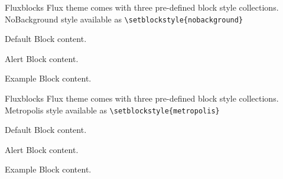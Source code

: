 \documentclass[9pt]{beamer}
\begin{document}
\begin{frame}[fragile]{Flux}{blocks}
  		Flux theme comes with three pre-defined block style collections.\\
  		NoBackground style available as \verb+\setblockstyle{nobackground}+\\[0.5cm]
  
   \centering
	\begin{minipage}[b]{0.5\textwidth}

	  \begin{block}{Default}
        Block content.
      \end{block}

      \begin{alertblock}{Alert}
        Block content.
      \end{alertblock}

      \begin{exampleblock}{Example}
        Block content.
      \end{exampleblock}       
      
	\end{minipage}
	
\end{frame}

\begin{frame}[fragile]{Flux}{blocks}
  		Flux theme comes with three pre-defined block style collections.\\
  		Metropolis style available as \verb+\setblockstyle{metropolis}+\\[0.5cm]
  
   \centering
	\begin{minipage}[b]{0.5\textwidth}

	  \begin{block}{Default}
        Block content.
      \end{block}

      \begin{alertblock}{Alert}
        Block content.
      \end{alertblock}

      \begin{exampleblock}{Example}
        Block content.
      \end{exampleblock}      
      
	\end{minipage}
	
\end{frame}
\end{document}
